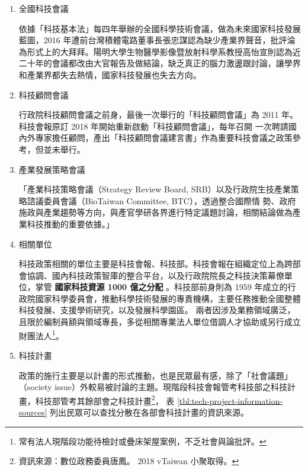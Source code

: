 \documentclass[12pt,a4paper]{article}
\begin{document}
\begin{enumerate}
\item 全國科技會議
\label{sec:org345938e}

依據「科技基本法」每四年舉辦的全國科學技術會議，做為未來國家科技發展藍圖，2016 年遭前台灣積體電路董事長張忠謀認為缺少產業界聲音，批評淪為形式上的大拜拜。陽明大學生物醫學影像暨放射科學系教授高怡宣則認為近二十年的會議都改由大官報告及做結論，缺乏真正的腦力激盪跟討論，讓學界和產業界都失去熱情，國家科技發展也失去方向。
\item 科技顧問會議
\label{sec:org67550b7}

行政院科技顧問會議之前身，最後一次舉行的「科技顧問會議」為 2011 年。科技會報原訂 2018 年開始重新啟動「科技顧問會議」，每年召開 一次聘請國內外專家擔任顧問，產出「科技顧問會議建言書」作為重要科技會議之政策參考，但並未舉行。
\item 產業發展策略會議
\label{sec:org1738496}

「產業科技策略會議（Strategy Review Board, SRB）以及行政院生技產業策略諮議委員會議（BioTaiwan Committee, BTC），透過整合國際情
勢、政府施政與產業趨勢等方向，與產官學研各界進行特定議題討論，相關結論做為產業科技推動的重要依據。」\citep{guo17}
\item 相關單位
\label{sec:org48e9a95}

科技政策相關的單位主要是科技會報、科技部。科技會報在組織定位上為跨部會協調、國內科技政策智庫的整合平台，以及行政院院長之科技決策幕僚單位，掌管 \textbf{國家科技資源 1000 億之分配} 。科技部前身則為 1959 年成立的行政院國家科學委員會，推動科學技術發展的專責機構，主要任務推動全國整體科技發展、支援學術研究，以及發展科學園區。
兩者因涉及業務領域廣泛，且限於編制員額與領域專長，多從相關專業法人單位借調人才協助或另行成立財團法人\footnote{常有法人現階段功能待檢討或疊床架屋案例，不乏社會與論批評。}。
\item 科技計畫
\label{sec:org199d45b}

政策的施行主要是以計畫的形式推動，也是民眾最有感，除了「社會議題」（society issue）外較易被討論的主題。現階段科技會報管考科技部之科技計畫，科技部管考其餘部會之科技計畫\footnote{資訊來源：數位政務委員唐鳳。 2018 vTaiwan 小聚取得。}， 表 \ref{tbl:tech-project-information-sources} 列出民眾可以查找分散在各部會科技計畫的資訊來源。


\end{enumerate}
\end{document}

